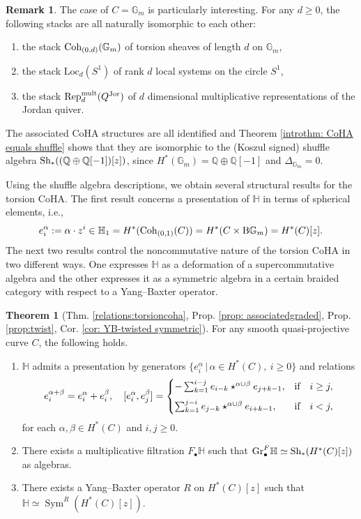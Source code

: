 \documentclass[10pt]{amsart}
\newcommand{\BQ}{\mathbb{Q}}
\newcommand{\BH}{\mathbb{H}}
\newcommand{\BGm}{\textnormal{B}\mathbb{G}_m}
\newcommand{\Coh}{\textnormal{Coh}}
\newcommand{\+}{{}^+}
\newcommand{\Sh}{\textnormal{Sh}}
\newcommand{\Gr}{\mathrm{Gr}}
\DeclareMathOperator{\Sym}{Sym}
\theoremstyle{definition}
\theoremstyle {definition}
\newtheorem{remark}[theorem]{Remark}
\theoremstyle {definition}
\newtheorem{introtheorem}{Theorem}
\def\verticaldistance{6pt}
\begin{document}
\begin{remark}
The case of $C=\mathbb{G}_m$ is particularly interesting. For any $d \geq 0$, the following stacks are all naturally isomorphic to each other:
\begin{enumerate}
    \item[i)] the stack $\Coh_{(0,d)}(\mathbb{G}_m)$ of torsion sheaves of length $d$ on $\mathbb{G}_m$,
    \item[ii)] the stack $\mathrm{Loc}_d(S^1)$ of rank $d$ local systems on the circle $S^1$,
    \item[iii)] the stack $\mathrm{Rep}_d^{\textnormal{mult}}(Q^{\textnormal{Jor}})$ of $d$ dimensional multiplicative representations of the Jordan quiver.
\end{enumerate}
The associated CoHA structures are all identified and Theorem \ref{introthm: CoHA equals shuffle} shows that they are isomorphic to the (Koszul signed) shuffle algebra $\Sh_{*}((\BQ\oplus\BQ[-1])[z])$, since $H^*(\mathbb{G}_m)=\BQ\oplus \BQ[-1]$ and $\Delta_{\mathbb{G}_m}=0$.
\end{remark}

Using the shuffle algebra descriptions, we obtain several structural results for the torsion CoHA. The first result concerns a presentation of $\BH$ in terms of spherical elements, i.e., 
$$e^\alpha_i:=\alpha \cdot z^i\in \BH_1=H^*(\Coh_{(0,1)}(C))=H^*(C\times \BGm)=H^*(C)[z]. 
$$
The next two results control the noncommutative nature of the torsion CoHA in two different ways. One expresses $\BH$ as a deformation of a supercommutative algebra and the other expresses it as a symmetric algebra in a certain braided category with respect to a Yang--Baxter operator. 


\begin{introtheorem}[Thm. \ref{relations:torsioncoha},  Prop. \ref{prop: associatedgraded}, Prop. \ref{prop:twist}, Cor. \ref{cor: YB-twisted symmetric}]
For any smooth quasi-projective curve $C$, the following holds. 
\begin{enumerate}
    \item [1)] $\BH$ admits a presentation by generators $\{e^\alpha_i\,|\,\alpha\in H^*(C),\ i\geq 0\}$ and relations
$$e^{\alpha+\beta}_i=e^\alpha_i+e^\beta_i,\quad [e^{\alpha}_i, e^{\beta}_j ] =  
\begin{cases}
-\sum_{k=1}^{i-j} e_{i-k} \star^{\alpha \cup \beta} e_{j+k-1}, & \textnormal{if}\quad  i\geq j, \\[\verticaldistance] \sum_{k=1}^{j-i} e_{j-k} \star^{\alpha \cup \beta} e_{i+k-1} , & \textnormal{if}\quad  i <j, 
\end{cases}
$$
for each $\alpha, \beta\in H^*(C)$ and $i, j\geq 0$.
    \item [2)] There exists a multiplicative filtration $F_\bullet \BH$ such that  $\Gr^F_\bullet \BH\simeq \Sh_{*}(H^*(C)[z])$ as algebras. 
    \item [3)] There exists a Yang--Baxter operator $R$ on $H^*(C)[z]$ such that $\BH\simeq \Sym^R(H^*(C)[z])$. 
\end{enumerate}
\end{introtheorem}
\end{document}
